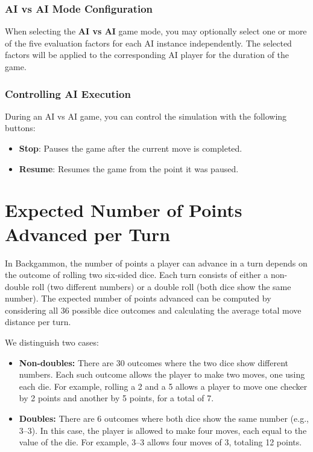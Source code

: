 \subsection*{AI vs AI Mode Configuration}

When selecting the \textbf{AI vs AI} game mode, you may optionally select one or more of the five evaluation factors for each AI instance independently. The selected factors will be applied to the corresponding AI player for the duration of the game.


\subsection*{Controlling AI Execution}

During an AI vs AI game, you can control the simulation with the following buttons:

\begin{itemize}
    \item \textbf{Stop}: Pauses the game after the current move is completed.
    \item \textbf{Resume}: Resumes the game from the point it was paused.
\end{itemize}

\chapter{Expected Number of Points Advanced per Turn}\label{avg_pips}

In Backgammon, the number of points a player can advance in a turn depends on the outcome of rolling two six-sided dice. Each turn consists of either a non-double roll (two different numbers) or a double roll (both dice show the same number). The expected number of points advanced can be computed by considering all 36 possible dice outcomes and calculating the average total move distance per turn.

We distinguish two cases:

\begin{itemize}
    \item \textbf{Non-doubles:} There are 30 outcomes where the two dice show different numbers. Each such outcome allows the player to make two moves, one using each die. For example, rolling a 2 and a 5 allows a player to move one checker by 2 points and another by 5 points, for a total of 7.
    \item \textbf{Doubles:} There are 6 outcomes where both dice show the same number (e.g., 3--3). In this case, the player is allowed to make four moves, each equal to the value of the die. For example, 3--3 allows four moves of 3, totaling 12 points.
\end{itemize}

